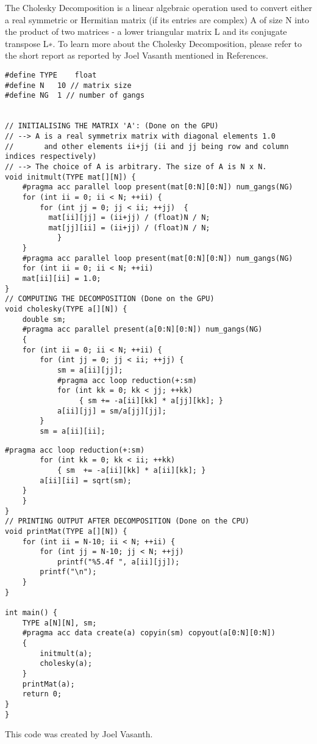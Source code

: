 The Cholesky Decomposition is a linear algebraic operation used to convert either a real symmetric or Hermitian matrix (if its entries are complex) A of size N into the product of two matrices - a lower triangular matrix L and its conjugate transpose L∗. To learn more about the Cholesky Decomposition, please refer to the short report as reported by Joel Vasanth mentioned in References\cite{Vasanth}. 

\begin{Code}
\begin{lstlisting}[frame=single, caption=CholeskyDecomposition.c (1/2), label=prototype, numbers=none]
#define TYPE	float
#define N	10 // matrix size
#define NG 	1 // number of gangs


// INITIALISING THE MATRIX 'A': (Done on the GPU)
// --> A is a real symmetrix matrix with diagonal elements 1.0
// 		 and other elements ii+jj (ii and jj being row and column indices respectively)
// --> The choice of A is arbitrary. The size of A is N x N.
void initmult(TYPE mat[][N]) {
	#pragma acc parallel loop present(mat[0:N][0:N]) num_gangs(NG)
	for (int ii = 0; ii < N; ++ii) {
		for (int jj = 0; jj < ii; ++jj)  {
	      mat[ii][jj] = (ii+jj) / (float)N / N;
	      mat[jj][ii] = (ii+jj) / (float)N / N;
			}
	}
	#pragma acc parallel loop present(mat[0:N][0:N]) num_gangs(NG)
	for (int ii = 0; ii < N; ++ii)
	mat[ii][ii] = 1.0;
}
// COMPUTING THE DECOMPOSITION (Done on the GPU)
void cholesky(TYPE a[][N]) {
	double sm;
	#pragma acc parallel present(a[0:N][0:N]) num_gangs(NG)
	{
	for (int ii = 0; ii < N; ++ii) {
		for (int jj = 0; jj < ii; ++jj) {
			sm = a[ii][jj];
			#pragma acc loop reduction(+:sm)
			for (int kk = 0; kk < jj; ++kk)
           		 { sm += -a[ii][kk] * a[jj][kk]; }
			a[ii][jj] = sm/a[jj][jj];
		}
		sm = a[ii][ii];
\end{lstlisting}
\end{Code}


\begin{Code}
\begin{lstlisting}[frame=single, caption=CholeskyDecomposition.c (2/2), label=prototype, numbers=none]
	  #pragma acc loop reduction(+:sm)
		for (int kk = 0; kk < ii; ++kk)
			{ sm  += -a[ii][kk] * a[ii][kk]; }
		a[ii][ii] = sqrt(sm);
	}
	}
}
// PRINTING OUTPUT AFTER DECOMPOSITION (Done on the CPU)
void printMat(TYPE a[][N]) {
	for (int ii = N-10; ii < N; ++ii) {
		for (int jj = N-10; jj < N; ++jj)
			printf("%5.4f ", a[ii][jj]);
		printf("\n");
	}
}

int main() {
	TYPE a[N][N], sm;
	#pragma acc data create(a) copyin(sm) copyout(a[0:N][0:N])
	{
		initmult(a);
		cholesky(a);
	}
	printMat(a);
	return 0;
}
}
\end{lstlisting}
\end{Code}

This code was created by Joel Vasanth.